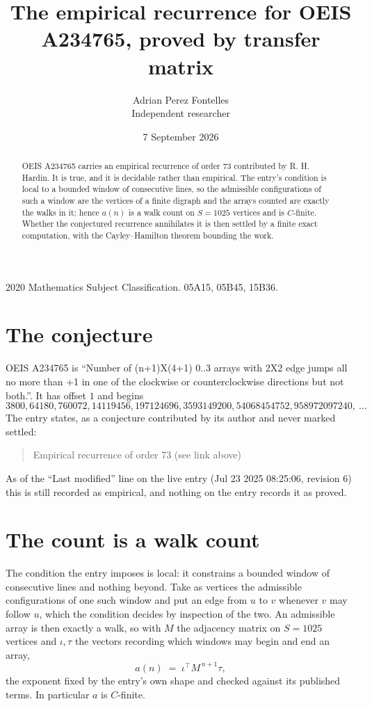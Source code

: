 \documentclass[11pt,a4paper]{article}
\title{The empirical recurrence for OEIS A234765, proved by transfer matrix}
\author{Adrian Perez Fontelles\\ \small Independent researcher}
\date{7 September 2026}
\theoremstyle{plain}
\theoremstyle{definition}
\begin{document}
\maketitle

\begin{abstract}
OEIS A234765 carries an empirical recurrence of order $73$ contributed by R. H. Hardin. It is
true, and it is decidable rather than empirical. The entry's condition is local to a bounded window of consecutive lines, so
the admissible configurations of such a window are the vertices of a finite digraph and the
arrays counted are exactly the walks in it; hence $a(n)$ is a walk count on $S=1025$ vertices
and is $C$-finite. Whether the conjectured recurrence annihilates it is then settled by a
finite exact computation, with the Cayley--Hamilton theorem bounding the work.
\end{abstract}

\noindent\small 2020 Mathematics Subject Classification. 05A15, 05B45, 15B36.\normalsize

\section{The conjecture}

OEIS A234765 is ``Number of (n+1)X(4+1) 0..3 arrays with 2X2 edge jumps all no more than +1 in one of the clockwise or counterclockwise directions but not both.''. It has offset $1$ and begins
\[
3800, 64180, 760072, 14119456, 197124696, 3593149200, 54068454752, 958972097240,\ \dots
\]
The entry states, as a conjecture contributed by its author and never marked settled:
\begin{quote}
Empirical recurrence of order 73 (see link above)
\end{quote}
As of the ``Last modified'' line on the live entry (Jul 23 2025 08:25:06, revision 6) this is still
recorded as empirical, and nothing on the entry records it as proved.

\section{The count is a walk count}

The condition the entry imposes is local: it constrains a bounded window of consecutive lines and nothing beyond. Take as
vertices the admissible configurations of one such window and put an edge from $u$ to $v$
whenever $v$ may follow $u$, which the condition decides by inspection of the two. An
admissible array is then exactly a walk, so with $M$ the adjacency matrix on $S=1025$ vertices
and $\iota,\tau$ the vectors recording which windows may begin and end an array,
\[
a(n)\;=\;\iota^{\!\top}M^{\,n+1}\tau ,
\]
the exponent fixed by the entry's own shape and checked against its published terms. In
particular $a$ is $C$-finite.
\end{document}
